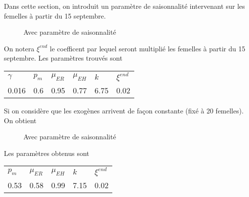 \documentclass[a4paper, 11pt]{article}
\begin{document}
Dans cette section, on introduit un paramètre de saisonnalité intervenant sur les femelles à partir du 15 septembre.

\begin{figure}[!h]
\centering
{}
\caption{Avec paramètre de saisonnalité}
\end{figure}


On notera $\xi^{end}$ le coefficent par lequel seront multiplié les femelles à partir du 15 septembre. Les paramètres trouvés sont 
\begin{center}
\begin{tabular}{llllll}
$\gamma$ & $p_m$ & $\mu_{ER}$ & $\mu_{EH}$ & $k$ & $\xi^{end}$\\
0.016 & 0.6 & 0.95 & 0.77 & 6.75 & 0.02
\end{tabular}
\end{center}


Si on considère que les exogènes arrivent de façon constante (fixé à 20 femelles). On obtient

\begin{figure}[!h]
\centering
{}
\caption{Avec paramètre de saisonnalité}
\end{figure}

Les paramètres obtenus sont 
\begin{center}
\begin{tabular}{lllll}
 $p_m$ & $\mu_{ER}$ & $\mu_{EH}$ & $k$ & $\xi^{end}$\\
 0.53 & 0.58 & 0.99 & 7.15 & 0.02
\end{tabular}
\end{center}
\end{document}
